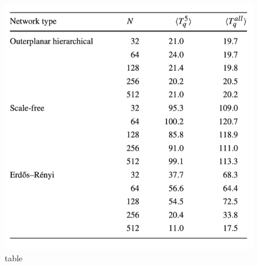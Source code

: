 \documentclass{article}
\begin{document}
 


	\begin{figure}[htbp]
		\centering
		\includegraphics{pic/table1.png}
		\caption{table}
	\end{figure}
\end{document}
